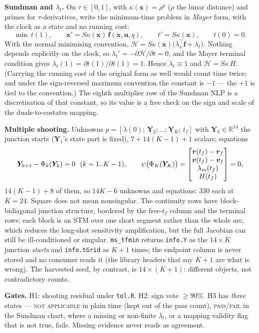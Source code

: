 \documentclass[11pt]{article}
\newcommand{\tf}{t_f}\newcommand{\R}{\mathbb{R}}
\newcommand{\file}[1]{\texttt{#1}}
\begin{document}
\begin{rig}
\textbf{Sundman and $\lambda_t$.} On $\tau\in[0,1]$, with
$\kappa(\bm x)=\rho^p$ ($\rho$ the lunar distance) and primes for
$\tau$-derivatives, write the minimum-time problem in \emph{Mayer} form, with
the clock as a state and no running cost:
\[
\min\ t(1),\qquad \bm x'=S\kappa(\bm x)\,\bm f(\bm x,\bm u,q),\qquad
t'=S\kappa(\bm x),\qquad t(0)=0 .
\]
With the normal minimising convention,
$\mathcal H=S\kappa(\bm x)\big(\lambda_x^{\!\top}\bm f+\lambda_t\big)$.
Nothing depends explicitly on the clock, so $\lambda_t'=-\partial\mathcal H/\partial t=0$,
and the Mayer terminal condition gives
$\lambda_t(1)=\partial t(1)/\partial t(1)=1$. Hence $\lambda_t\equiv1$ and
$\mathcal H=S\kappa\,H$. (Carrying the running cost of the original form
as well would count time twice; and under the sign-reversed maximum
convention the constant is $-1$ --- the $+1$ is tied to the convention.) The
eighth multiplier row of the Sundman NLP is a discretisation of that
constant, so its value is a free check on the sign and scale of the
duals-to-costates mapping.

\textbf{Multiple shooting.} Unknowns $p=[\lambda(0);\,\bm Y_2;\dots;\bm Y_K;\,\tf]$
with $\bm Y_k\in\R^{14}$ the junction starts ($\bm Y_1$'s state part is
fixed), $7+14(K-1)+1$ scalars; equations
\[
\bm Y_{k+1}-\Phi_k(\bm Y_k)=0\ \ (k=1..K-1),\qquad
\psi\big(\Phi_K(\bm Y_K)\big)=
\begin{bmatrix}\bm r(\tf)-\bm r_f\\ \bm v(\tf)-\bm v_f\\ \lm(\tf)\\ H(\tf)\end{bmatrix}=0,
\]
$14(K-1)+8$ of them, so $14K-6$ unknowns and equations: 330 each at $K=24$.
Square does not mean nonsingular. The continuity rows have block-bidiagonal
junction structure, bordered by the free-$\tf$ column and the terminal
rows; each block is an STM over one short segment rather than the whole
arc, which reduces the long-shot sensitivity amplification, but the full
Jacobian can still be ill-conditioned or singular. \file{ms\_tfmin} returns
\file{info.Y} as the $14\times K$ junction \emph{starts} and
\file{info.tGrid} as $K+1$ times; the endpoint column is never stored and
no consumer reads it (the library headers that say $K+1$ are what is wrong).
The harvested seed, by contrast, is $14\times(K+1)$: different objects, not
contradictory counts.

\textbf{Gates.} H1: shooting residual under \file{tol.R}. H2: sign vote
$\ge90\%$. H3 has \emph{three} states --- \textsc{not applicable} in plain
time (kept out of the pass count), \textsc{pass}/\textsc{fail} in the Sundman
chart, where a missing or non-finite $\lambda_t$, or a mapping validity flag
that is not true, fails. Missing evidence never reads as agreement.
\end{rig}
\end{document}
